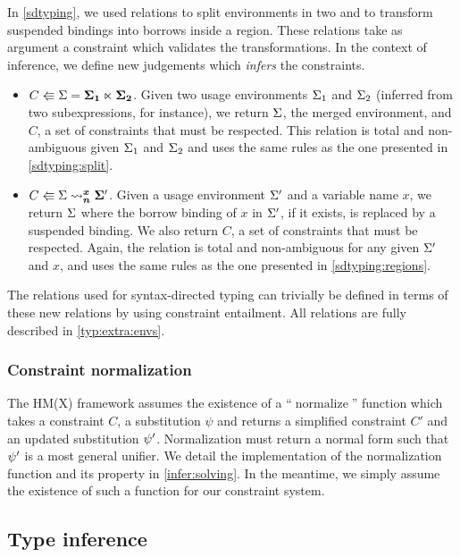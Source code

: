 In \cref{sdtyping}, we used relations to split environments in two and to
transform suspended bindings into borrows inside a region.
These relations take as argument a constraint which validates
the transformations.
In the context of inference, we define new judgements which \emph{infers}
the constraints.
\begin{itemize}[leftmargin=*]
\item $\bsplit{C}{\Sv}{\bm{\Sv_1}}{\bm{\Sv_2}}$.
  Given two usage environments $\Sv_1$ and $\Sv_2$
  (inferred from two subexpressions, for instance),
  we return $\Sv$, the merged environment, and $C$, a set
  of constraints that must be respected.
  This relation is total and non-ambiguous given $\Sv_1$ and $\Sv_2$
  and uses the same rules as the one presented in \cref{sdtyping:split}.
\item $\bregion[\bm{n}]{C}{\bm{x}}{\Sv}{\bm\Sv'}$.
  Given a usage environment $\Sv'$ and a variable name $x$, we return
  $\Sv$ where the borrow binding of $x$ in $\Sv'$, if it exists, is replaced by
  a suspended binding. We also return $C$, a set of constraints that must
  be respected.
  Again, the relation is total and non-ambiguous for any given $\Sv'$ and $x$,
  and uses the same rules as the one presented in \cref{sdtyping:regions}.
\end{itemize}

The relations used for syntax-directed typing can trivially be defined
in terms of these new relations by using constraint entailment.
All relations are fully described in \cref{typ:extra:envs}.

\subsubsection{Constraint normalization}

The HM(X) framework assumes the existence of a ``$\operatorname{normalize}$''
function which takes a constraint $C$, a substitution $\psi$ and returns a
simplified constraint $C'$
and an updated substitution $\unif'$.
Normalization must return a normal form such that $\unif'$ is a most general unifier.
We detail the implementation
of the normalization function and its property in \cref{infer:solving}.
In the meantime, we simply
assume the existence of such a function for our constraint system.

\subsection{Type inference}

